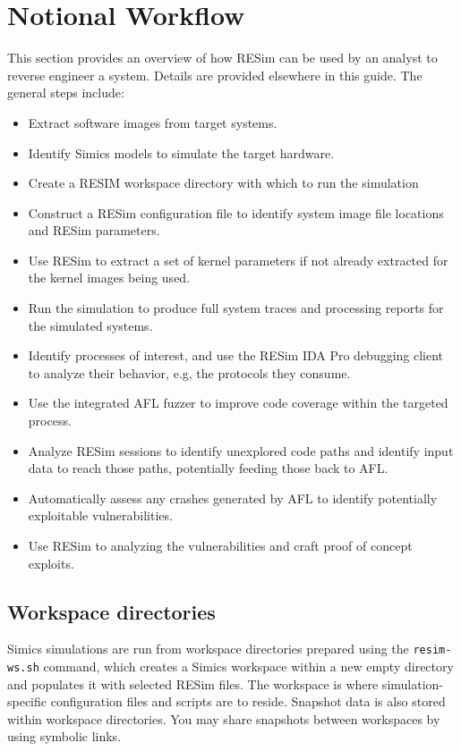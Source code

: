 \documentclass[titlepage]{article}
\begin{document}
\section{Notional Workflow}
\label{workflow}
This section provides an overview of how RESim can be used by an analyst to reverse engineer a system. Details are provided elsewhere
in this guide.  The general steps include:
\begin{itemize}
\item Extract software images from target systems.
\item Identify Simics models to simulate the target hardware.
\item Create a RESIM workspace directory with which to run the simulation
\item Construct a RESim configuration file to identify system image file locations and RESim parameters.
\item Use RESim to extract a set of kernel parameters if not already extracted for the kernel images being used.
\item Run the simulation to produce full system traces and processing reports for the simulated systems.
\item Identify processes of interest, and use the RESim IDA Pro debugging client to analyze their behavior, e.g, the protocols they consume.
\item Use the integrated AFL fuzzer to improve code coverage within the targeted process.
\item Analyze RESim sessions to identify unexplored code paths and identify input data to reach those paths, potentially feeding those back to AFL.
\item Automatically assess any crashes generated by AFL to identify potentially exploitable vulnerabilities.
\item Use RESim to analyzing the vulnerabilities and craft proof of concept exploits.
\end{itemize}

\subsection{Workspace directories}
Simics simulations are run from workspace directories prepared using the {\tt resim-ws.sh} command, which creates a Simics workspace within a new empty
directory and populates it with selected RESim files.  The workspace is where simulation-specific configuration files and scripts are to reside.  Snapshot
data is also stored within workspace directories.  You may share snapshots between workspaces by using symbolic links.  
\end{document}
